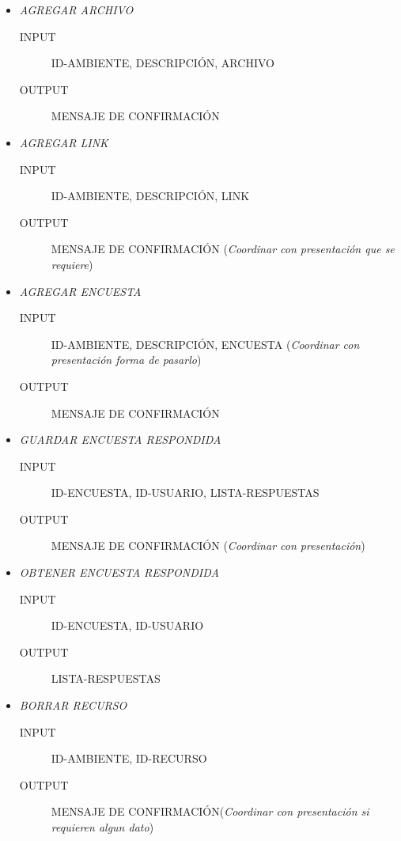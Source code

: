 \documentclass{article}
\begin{document}
\begin{description}
\begin{itemize}
			\item \emph{AGREGAR ARCHIVO}
			\begin{description}
				\item[INPUT] ID-AMBIENTE, DESCRIPCI\'ON, ARCHIVO
				\item[OUTPUT] MENSAJE DE CONFIRMACI\'ON\\
			\end{description}
			\item \emph{AGREGAR LINK}
			\begin{description}
				\item[INPUT] ID-AMBIENTE, DESCRIPCI\'ON, LINK
				\item[OUTPUT] MENSAJE DE CONFIRMACI\'ON (\emph{Coordinar con presentaci\'on que se requiere})\\
			\end{description}
			\item \emph{AGREGAR ENCUESTA}
			\begin{description}
				\item[INPUT] ID-AMBIENTE, DESCRIPCI\'ON, ENCUESTA (\emph{Coordinar con presentaci\'on forma de pasarlo})
				\item[OUTPUT] MENSAJE DE CONFIRMACI\'ON\\
			\end{description}
			\item \emph{GUARDAR ENCUESTA RESPONDIDA}
			\begin{description}
				\item[INPUT] ID-ENCUESTA, ID-USUARIO, LISTA-RESPUESTAS
				\item[OUTPUT] MENSAJE DE CONFIRMACI\'ON (\emph{Coordinar con presentaci\'on})\\
			\end{description}
			\item \emph{OBTENER ENCUESTA RESPONDIDA}
			\begin{description}
				\item[INPUT] ID-ENCUESTA, ID-USUARIO
				\item[OUTPUT] LISTA-RESPUESTAS\\
			\end{description}
			\item \emph{BORRAR RECURSO}
			\begin{description}
				\item[INPUT] ID-AMBIENTE, ID-RECURSO
				\item[OUTPUT] MENSAJE DE CONFIRMACI\'ON(\emph{Coordinar con presentaci\'on si requieren algun dato})\\

\end{description}
\end{itemize}
\end{description}
\end{document}
